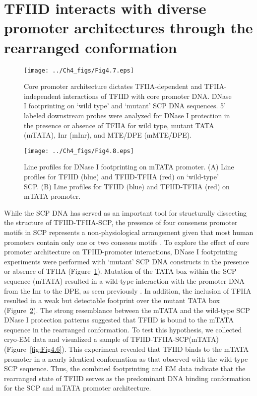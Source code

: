 \section{TFIID interacts with diverse promoter architectures through the rearranged conformation}
\begin{figure}
\centering
\texttt{[image: ../Ch4\_figs/Fig4.7.eps]}
\caption[Core promoter architecture dictates TFIIA-dependent and TFIIA-independent interactions of TFIID with core promoter DNA]{Core promoter architecture dictates TFIIA-dependent and TFIIA-independent interactions of TFIID with core promoter DNA. DNase I footprinting on ‘wild type’ and ‘mutant’ SCP DNA sequences. 5’ labeled downstream probes were analyzed for DNase I protection in the presence or absence of TFIIA for wild type, mutant TATA (mTATA), Inr (mInr), and MTE/DPE (mMTE/DPE).}
\label{fig:Fig4.7}
\end{figure}
\begin{figure}
\centering
\texttt{[image: ../Ch4\_figs/Fig4.8.eps]}
\caption[Line profiles for DNase I footprinting on mTATA promoter]{Line profiles for DNase I footprinting on mTATA promoter.  (A) Line profiles for TFIID (blue) and TFIID-TFIIA (red) on ‘wild-type’ SCP.  (B) Line profiles for TFIID (blue) and TFIID-TFIIA (red) on mTATA promoter.}
\label{fig:Fig4.8}
\end{figure}
While the SCP DNA has served as an important tool for structurally dissecting the structure of TFIID-TFIIA-SCP, the presence of four consensus promoter motifs in SCP represents a non-physiological arrangement given that most human promoters contain only one or two consesus motifs \cite{Juven-Gershon_468}. To explore the effect of core promoter architecture on TFIID-promoter interactions, DNase I footprinting experiments were performed with ‘mutant’ SCP DNA constructs in the presence or absence of TFIIA (Figure~\ref{fig:Fig4.7}). Mutation of the TATA box within the SCP sequence (mTATA) resulted in a wild-type interaction with the promoter DNA from the Inr to the DPE, as seen previously \cite{Juven-Gershon_1249}. In addition, the inclusion of TFIIA resulted in a weak but detectable footprint over the mutant TATA box (Figure~\ref{fig:Fig4.8}). The strong resemblance between the mTATA and the wild-type SCP DNase I protection patterns suggested that TFIID is bound to the mTATA sequence in the rearranged conformation. To test this hypothesis, we collected cryo-EM data and visualized a sample of TFIID-TFIIA-SCP(mTATA) (Figure~\ref{fig:Fig4.6}). This experiment revealed that TFIID binds to the mTATA promoter in a nearly identical conformation as that observed with the wild-type SCP sequence. Thus, the combined footprinting and EM data indicate that the rearranged state of TFIID serves as the predominant DNA binding conformation for the SCP and mTATA promoter architecture.\\
